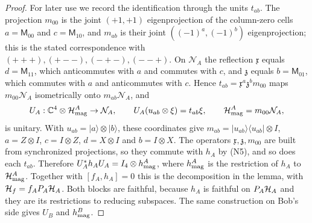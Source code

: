 \begin{proof}
For later use we record the identification through the units $t_{ab}$. The projection $m_{00}$ is the joint $(+1,+1)$ eigenprojection of the column-zero cells $a=\mathsf M_{00}$ and $c=\mathsf M_{10}$, and $m_{ab}$ is their joint $((-1)^a,(-1)^b)$ eigenprojection; this is the stated correspondence with $(+++),(+--),(-+-),(--+)$. On $\mathcal N_A$ the reflection $\mathfrak x$ equals $d=\mathsf M_{11}$, which anticommutes with $a$ and commutes with $c$, and $\mathfrak z$ equals $b=\mathsf M_{01}$, which commutes with $a$ and anticommutes with $c$. Hence $t_{ab}=\mathfrak x^a\mathfrak z^bm_{00}$ maps $m_{00}\mathcal N_A$ isometrically onto $m_{ab}\mathcal N_A$, and
\[
 U_A:\mathbb C^4\otimes\mathcal H^A_{\rm mag}\to\mathcal N_A,\qquad
 U_A(u_{ab}\otimes\xi)=t_{ab}\xi,\qquad \mathcal H^A_{\rm mag}=m_{00}\mathcal N_A,
\]
is unitary. With $u_{ab}=|a\rangle\otimes|b\rangle$, these coordinates give $m_{ab}=|u_{ab}\rangle\langle u_{ab}|\otimes I$, $a=Z\otimes I$, $c=I\otimes Z$, $d=X\otimes I$ and $b=I\otimes X$. The operators $\mathfrak x,\mathfrak z,m_{00}$ are built from synchronized projections, so they commute with $h_A$ by (N5), and so does each $t_{ab}$. Therefore $U_A^*h_AU_A=I_4\otimes h^A_{\rm mag}$, where $h^A_{\rm mag}$ is the restriction of $h_A$ to $\mathcal H^A_{\rm mag}$. Together with $[f_A,h_A]=0$ this is the decomposition in the lemma, with $\mathcal H_f=f_AP_A\mathcal H_A$. Both blocks are faithful, because $h_A$ is faithful on $P_A\mathcal H_A$ and they are its restrictions to reducing subspaces. The same construction on Bob's side gives $U_B$ and $h^B_{\rm mag}$.


\end{proof}

